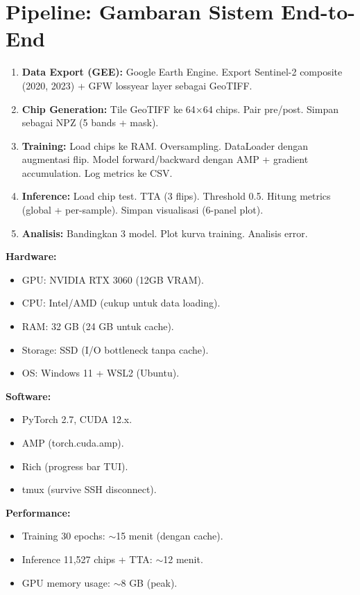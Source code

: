 \documentclass[10pt,a4paper,onecolumn]{article}
\begin{document}
\section{Pipeline: Gambaran Sistem End-to-End}

\begin{enumerate}[nosep]
    \item \textbf{Data Export (GEE):} Google Earth Engine.
          Export Sentinel-2 composite (2020, 2023) + GFW lossyear
          layer sebagai GeoTIFF.
    \item \textbf{Chip Generation:} Tile GeoTIFF ke 64$\times$64
          chips. Pair pre/post. Simpan sebagai NPZ (5 bands + mask).
    \item \textbf{Training:} Load chips ke RAM. Oversampling.
          DataLoader dengan augmentasi flip. Model forward/backward
          dengan AMP + gradient accumulation. Log metrics ke CSV.
    \item \textbf{Inference:} Load chip test. TTA (3 flips).
          Threshold 0.5. Hitung metrics (global + per-sample).
          Simpan visualisasi (6-panel plot).
    \item \textbf{Analisis:} Bandingkan 3 model. Plot kurva training.
          Analisis error.
\end{enumerate}

\textbf{Hardware:}
\begin{itemize}[nosep]
    \item GPU: NVIDIA RTX 3060 (12GB VRAM).
    \item CPU: Intel/AMD (cukup untuk data loading).
    \item RAM: 32 GB (24 GB untuk cache).
    \item Storage: SSD (I/O bottleneck tanpa cache).
    \item OS: Windows 11 + WSL2 (Ubuntu).
\end{itemize}

\textbf{Software:}
\begin{itemize}[nosep]
    \item PyTorch 2.7, CUDA 12.x.
    \item AMP (torch.cuda.amp).
    \item Rich (progress bar TUI).
    \item tmux (survive SSH disconnect).
\end{itemize}

\textbf{Performance:}
\begin{itemize}[nosep]
    \item Training 30 epochs: $\sim$15 menit (dengan cache).
    \item Inference 11,527 chips + TTA: $\sim$12 menit.
    \item GPU memory usage: $\sim$8 GB (peak).
\end{itemize}
\end{document}
